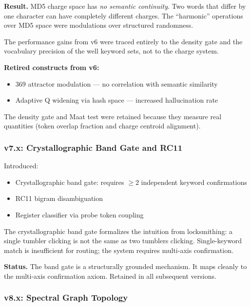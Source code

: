 \documentclass[11pt,twoside]{article}
\begin{document}
\begin{retiredenv}
\textbf{Result.} MD5 charge space has \emph{no semantic continuity}. Two words that
differ by one character can have completely different charges. The ``harmonic''
operations over MD5 space were modulations over structured randomness.

The performance gains from v6 were traced entirely to the density gate and the
vocabulary precision of the well keyword sets, not to the charge system.

\textbf{Retired constructs from v6:}
\begin{itemize}
  \item 369 attractor modulation --- no correlation with semantic similarity
  \item Adaptive Q widening via hash space --- increased hallucination rate
\end{itemize}

The density gate and Maat test were retained because they measure real quantities
(token overlap fraction and charge centroid alignment).
\end{retiredenv}

\subsubsection{v7.x: Crystallographic Band Gate and RC11}

Introduced:
\begin{itemize}
  \item Crystallographic band gate: requires $\geq 2$ independent keyword confirmations
  \item RC11 bigram disambiguation
  \item Register classifier via probe token coupling
\end{itemize}

The crystallographic band gate formalizes the intuition from locksmithing: a single
tumbler clicking is not the same as two tumblers clicking. Single-keyword match
is insufficient for routing; the system requires multi-axis confirmation.

\begin{confirmedenv}
\textbf{Status.} The band gate is a structurally grounded mechanism. It maps cleanly
to the multi-axis confirmation axiom. Retained in all subsequent versions.
\end{confirmedenv}

\subsubsection{v8.x: Spectral Graph Topology}
\end{document}
